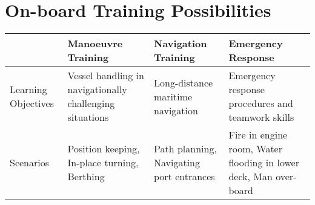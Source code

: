\section{On-board Training Possibilities}

\begin{table}[h]
	\centering
	\begin{tabular}{@{}p{2.2cm}|p{3cm}|p{3cm}|p{3cm}|@{}}
		\toprule
		\multicolumn{1}{c|}{ } & \multicolumn{1}{P{3cm}|}{\textbf{Manoeuvre Training}} & \multicolumn{1}{P{3cm}|}{\textbf{Navigation Training}} & \multicolumn{1}{P{3cm}|}{\textbf{Emergency Response}} \\ 
		\hline
		Learning Objectives & Vessel handling in navigationally challenging situations & Long-distance maritime navigation & Emergency response procedures and teamwork skills \\
		\hline
		Scenarios & Position keeping, In-place turning, Berthing
		& 
		Path planning, Navigating port entrances
		& 
		Fire in engine room, Water flooding in lower deck, Man over-board

\end{tabular}
\end{table}
